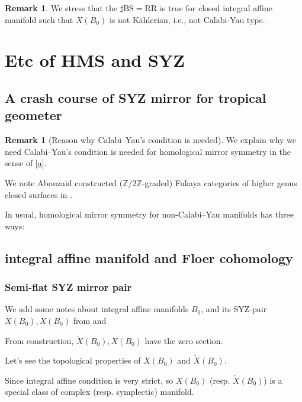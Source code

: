 \documentclass[a4paper,dvipdfmx,reqno,12pt]{amsart}
\theoremstyle{definition}
\newtheorem{Rmk}[Thm]{Remark}
\newcommand{\Z}{\mathbb{Z}}%
\numberwithin{equation}{section}
\begin{document}
\begin{Rmk}
  We stress that the $\sharp \mathrm{BS}=\mathrm{RR}$ is true for closed integral affine manifold such that $X(B_0)$ is not K\"ahlerian, i.e., not Calabi-Yau type.
\end{Rmk}



\section{Etc of HMS and SYZ}

\subsection{A crash course of SYZ mirror for tropical 
geometer}

\begin{Rmk}[{Reason why Calabi--Yau's condition is needed}]

We explain why we need Calabi--Yau's condition is needed for
homological mirror symmetry in the sense of \cref{a}.

We note Abouzaid constructed ($\Z/2\Z$-graded)
Fukaya categories of higher genus closed surfaces in
\cite{MR2383898}. 
\end{Rmk}

In usual, homological mirror symmetry 
for non-Calabi--Yau manifolds has three ways:



\subsection{integral affine manifold and Floer cohomology}

\subsubsection{Semi-flat SYZ mirror pair}

We add some notes about integral affine manifolds $B_0$, and its SYZ-pair $\check{X}(B_0), X(B_0)$ from \cite[Chapter 6]{aspinwallDirichletBranesMirror2009} and \cite{MR2737696,MR3079343}



From construction, $\check{X}(B_0), X(B_0)$ have the zero section.

Let's see the topological properties of $X(B_0)$ and $\check{X}(B_0)$.

Since integral affine condition is very strict, so $X(B_0)$ (resp. $\check{X}(B_0)$) is a special class of complex (resp. symplectic) manifold.
\end{document}
